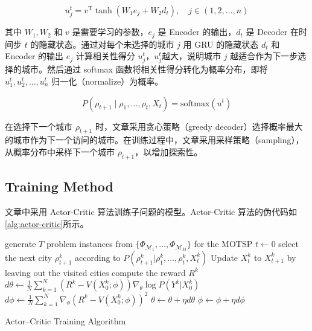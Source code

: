 \documentclass[fontset=none]{ctexart}
\begin{document}
\begin{equation}
    u_j^t = v^\mathrm{T} \tanh(W_1 e_j + W_2 d_t), \quad j \in (1, 2, \ldots, n)\label{eq:attention}
\end{equation}

其中 $W_1, W_2$ 和 $v$ 是需要学习的参数，$e_j$ 是 Encoder 的输出，$d_t$ 是 Decoder 在时间步 $t$ 的隐藏状态。通过对每个未选择的城市 $j$ 用 GRU 的隐藏状态 $d_t$ 和 Encoder 的输出 $e_j$ 计算相关性得分 $u_j^t$，$u_j^t$越大，说明城市 $j$ 越适合作为下一步选择的城市。然后通过 softmax 函数将相关性得分转化为概率分布，即将 $u_1^t, u_2^t, \ldots, u_n^t$ 归一化（normalize）为概率。

\begin{equation}
    P(\rho_{t + 1} \mid \rho_1, \ldots, \rho_t, X_t) = \text{softmax}(u^t)\label{eq:softmax}
\end{equation}

在选择下一个城市 $\rho_{t + 1}$ 时，文章采用贪心策略（greedy decoder）选择概率最大的城市作为下一个访问的城市。在训练过程中，文章采用采样策略（sampling），从概率分布中采样下一个城市 $\rho_{t + 1}$，以增加探索性。

\subsection{Training Method}

文章中采用 Actor-Critic 算法训练子问题的模型\cite{nazariReinforcementLearningSolving2018, belloNeuralCombinatorialOptimization2017}。Actor-Critic 算法的伪代码如\cref{alg:actor-critic}所示。

\begin{algorithm}[H]
    \SetAlgoLined
    \SetNoFillComment
    \vspace{3mm}
     {
        generate $T$ problem instances from $\{\Phi_{\mathcal{M}_1}, \dots, \Phi_{\mathcal{M}_M}\}$ for the MOTSP\;
         {
            $t \leftarrow 0$\;
             {
                select the next city $\rho_{t+1}^k$ according to $P(\rho_{t+1}^k | \rho_1^k, \dots, \rho_t^k, X_t^k)$\;
                Update $X_t^k$ to $X_{t+1}^k$ by leaving out the visited cities\;
            }
            compute the reward $R^k$\;
        }
        $d\theta \leftarrow \frac{1}{N} \sum_{k=1}^N \left( R^k - V(X_0^k; \phi) \right) \nabla_\theta \log P(Y^k | X_0^k)$\;
        $d\phi \leftarrow \frac{1}{N} \sum_{k=1}^N \nabla_\phi \left( R^k - V(X_0^k; \phi) \right)^2$\;
        $\theta \leftarrow \theta + \eta d\theta$\;
        $\phi \leftarrow \phi + \eta d\phi$\;
    }
    \caption{Actor--Critic Training Algorithm}
    \label{alg:actor-critic}
\end{algorithm}
\end{document}
